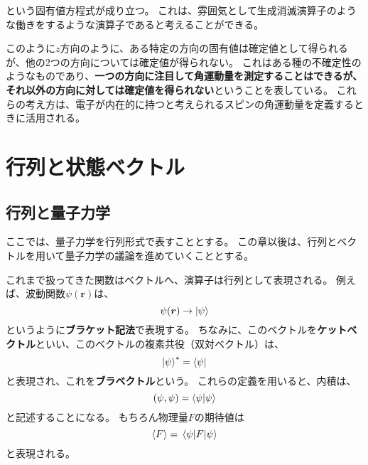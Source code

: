 \documentclass[a4paper]{jsreport}
\begin{document}
            という固有値方程式が成り立つ。
            これは、雰囲気として生成消滅演算子のような働きをするような演算子であると考えることができる。\par
            このように$z$方向のように、ある特定の方向の固有値は確定値として得られるが、他の2つの方向については確定値が得られない。
            これはある種の不確定性のようなものであり、\textbf{一つの方向に注目して角運動量を測定することはできるが、それ以外の方向に対しては確定値を得られない}ということを表している。
            これらの考え方は、電子が内在的に持つと考えられるスピンの角運動量を定義するときに活用される。

    \chapter{行列と状態ベクトル}

        \section{行列と量子力学}
            ここでは、量子力学を行列形式で表すこととする。
            この章以後は、行列とベクトルを用いて量子力学の議論を進めていくこととする。\par
            これまで扱ってきた関数はベクトルへ、演算子は行列として表現される。
            例えば、波動関数$\psi(\boldsymbol{r})$は、
            \begin{equation}
                \psi(\boldsymbol{r}) \rightarrow \ket{\psi}
            \end{equation}
            というように\textbf{ブラケット記法}で表現する。
            ちなみに、このベクトルを\textbf{ケットベクトル}といい、このベクトルの複素共役（双対ベクトル）は、
            \begin{equation}
                \ket{\psi}^\ast = \bra{\psi}
            \end{equation}
            と表現され、これを\textbf{ブラベクトル}という。
            これらの定義を用いると、内積は、
            \begin{equation}
                (\psi, \psi) = \braket{\psi}{\psi}
            \end{equation}
            と記述することになる。
            もちろん物理量$F$の期待値は
            \begin{equation}
                \ev{F} = \mel{\psi}{F}{\psi}
            \end{equation}
            と表現される。
\end{document}
